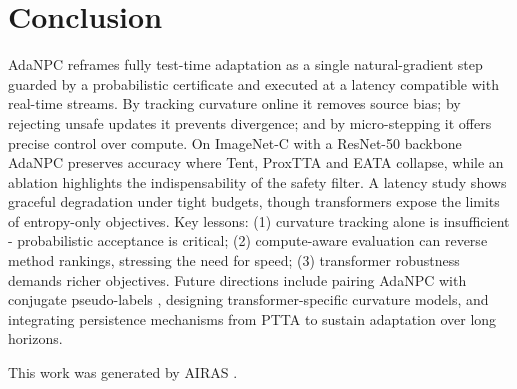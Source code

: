 \documentclass{article} %
\begin{document}
\section{Conclusion}
\label{sec:conclusion}
AdaNPC reframes fully test-time adaptation as a single natural-gradient step guarded by a probabilistic certificate and executed at a latency compatible with real-time streams. By tracking curvature online it removes source bias; by rejecting unsafe updates it prevents divergence; and by micro-stepping it offers precise control over compute. On ImageNet-C with a ResNet-50 backbone AdaNPC preserves accuracy where Tent, ProxTTA and EATA collapse, while an ablation highlights the indispensability of the safety filter. A latency study shows graceful degradation under tight budgets, though transformers expose the limits of entropy-only objectives.
Key lessons: (1) curvature tracking alone is insufficient - probabilistic acceptance is critical; (2) compute-aware evaluation can reverse method rankings, stressing the need for speed; (3) transformer robustness demands richer objectives. Future directions include pairing AdaNPC with conjugate pseudo-labels \cite{goyal-2022-test}, designing transformer-specific curvature models, and integrating persistence mechanisms from PTTA \cite{yuan-2023-robust,hoang-2023-persistent} to sustain adaptation over long horizons.

This work was generated by \textsc{AIRAS} \citep{airas2025}.



\end{document}
